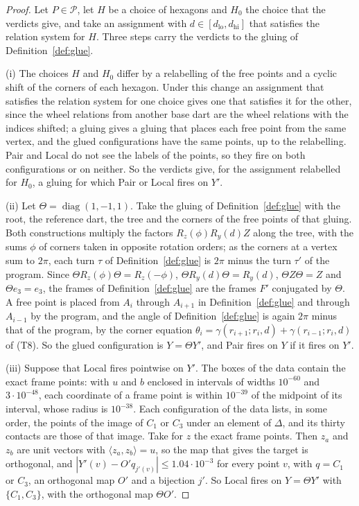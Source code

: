 \documentclass[12pt]{amsart}
\theoremstyle{definition}
\theoremstyle{plain}
\theoremstyle{definition}
\newcommand{\dlo}{d_{\mathrm{lo}}}
\newcommand{\dhi}{d_{\mathrm{hi}}}
\newcommand{\CI}{C_1}
\newcommand{\CIII}{C_3}
\begin{document}
\begin{proof}
Let $P\in \mathcal P$, let $H$ be a choice of hexagons and $H_0$ the choice that the verdicts give, and take an assignment with $d\in[\dlo,\dhi]$ that satisfies the relation system for $H$. Three steps carry the verdicts to the gluing of Definition~\ref{def:glue}.

(i) The choices $H$ and $H_0$ differ by a relabelling of the free points and a cyclic shift of the corners of each hexagon. Under this change an assignment that satisfies the relation system for one choice gives one that satisfies it for the other, since the wheel relations from another base dart are the wheel relations with the indices shifted; a gluing gives a gluing that places each free point from the same vertex, and the glued configurations have the same points, up to the relabelling. Pair and Local do not see the labels of the points, so they fire on both configurations or on neither. So the verdicts give, for the assignment relabelled for $H_0$, a gluing for which Pair or Local fires on $Y'$.

(ii) Let $\Theta=\operatorname{diag}(1,-1,1)$. Take the gluing of Definition~\ref{def:glue} with the root, the reference dart, the tree and the corners of the free points of that gluing. Both constructions multiply the factors $R_z(\phi)R_y(d)Z$ along the tree, with the sums $\phi$ of corners taken in opposite rotation orders; as the corners at a vertex sum to $2\pi$, each turn $\tau$ of Definition~\ref{def:glue} is $2\pi$ minus the turn $\tau'$ of the program. Since $\Theta R_z(\phi)\Theta=R_z(-\phi)$, $\Theta R_y(d)\Theta=R_y(d)$, $\Theta Z\Theta=Z$ and $\Theta e_3=e_3$, the frames of Definition~\ref{def:glue} are the frames $F'$ conjugated by $\Theta$. A free point is placed from $A_i$ through $A_{i+1}$ in Definition~\ref{def:glue} and through $A_{i-1}$ by the program, and the angle of Definition~\ref{def:glue} is again $2\pi$ minus that of the program, by the corner equation $\theta_i=\gamma(r_{i+1};r_i,d)+\gamma(r_{i-1};r_i,d)$ of (T8). So the glued configuration is $Y=\Theta Y'$, and Pair fires on $Y$ if it fires on $Y'$.

(iii) Suppose that Local fires pointwise on $Y'$. The boxes of the data contain the exact frame points: with $u$ and $b$ enclosed in intervals of widths $10^{-60}$ and $3\cdot10^{-48}$, each coordinate of a frame point is within $10^{-39}$ of the midpoint of its interval, whose radius is $10^{-38}$. Each configuration of the data lists, in some order, the points of the image of $\CI$ or $\CIII$ under an element of $\Delta$, and its thirty contacts are those of that image. Take for $z$ the exact frame points. Then $z_a$ and $z_b$ are unit vectors with $\langle z_a,z_b\rangle=u$, so the map that gives the target is orthogonal, and $|Y'(v)-O'q_{j'(v)}|\le1.04\cdot10^{-3}$ for every point $v$, with $q=\CI$ or $\CIII$, an orthogonal map $O'$ and a bijection $j'$. So Local fires on $Y=\Theta Y'$ with $\{\CI,\CIII\}$, with the orthogonal map $\Theta O'$.


\end{proof}
\end{document}
